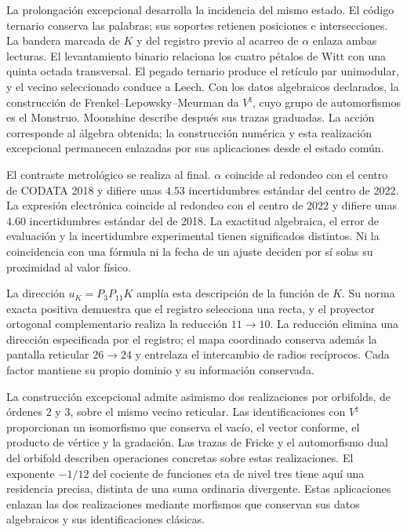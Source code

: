 La prolongación excepcional desarrolla la incidencia del mismo estado. El código ternario conserva las palabras; sus soportes retienen posiciones e intersecciones. La bandera marcada de \(K\) y del registro previo al acarreo de \(\alpha\) enlaza ambas lecturas. El levantamiento binario relaciona los cuatro pétalos de Witt con una quinta octada transversal. El pegado ternario produce el retículo par unimodular, y el vecino seleccionado conduce a Leech. Con los datos algebraicos declarados, la construcción de Frenkel--Lepowsky--Meurman da \(V^\natural\), cuyo grupo de automorfismos es el Monstruo\cite{flm}. Moonshine describe después sus trazas graduadas\cite{borcherds}. La acción corresponde al álgebra obtenida; la construcción numérica y esta realización excepcional permanecen enlazadas por sus aplicaciones desde el estado común.

El contraste metrológico se realiza al final\cite{codata2018,codata2022}. \(\alpha\) coincide al redondeo con el centro de CODATA 2018 y difiere unas \(4.53\) incertidumbres estándar del centro de 2022. La expresión electrónica coincide al redondeo con el centro de 2022 y difiere unas \(4.60\) incertidumbres estándar del de 2018. La exactitud algebraica, el error de evaluación y la incertidumbre experimental tienen significados distintos. Ni la coincidencia con una fórmula ni la fecha de un ajuste deciden por sí solas su proximidad al valor físico.



La dirección \(u_K=P_3P_{11}K\) amplía esta descripción de la función
de \(K\). Su norma exacta positiva demuestra que el registro selecciona
una recta, y el proyector ortogonal complementario realiza la reducción
\(11\to10\). La reducción elimina una dirección especificada por el
registro; el mapa coordinado conserva además la pantalla reticular
\(26\to24\) y entrelaza el intercambio de radios recíprocos. Cada
factor mantiene su propio dominio y su información conservada.

La construcción excepcional admite asimismo dos realizaciones por
orbifolds, de órdenes \(2\) y \(3\), sobre el mismo vecino reticular.
Las identificaciones con \(V^\natural\) proporcionan un isomorfismo
que conserva el vacío, el vector conforme, el producto de vértice y
la gradación. Las trazas de Fricke y el automorfismo dual del orbifold
describen operaciones concretas sobre estas realizaciones. El exponente
\(-1/12\) del cociente de funciones eta de nivel tres tiene aquí
una residencia precisa, distinta de una suma ordinaria divergente.
Estas aplicaciones enlazan las dos realizaciones mediante morfismos
que conservan sus datos algebraicos y sus identificaciones clásicas.

